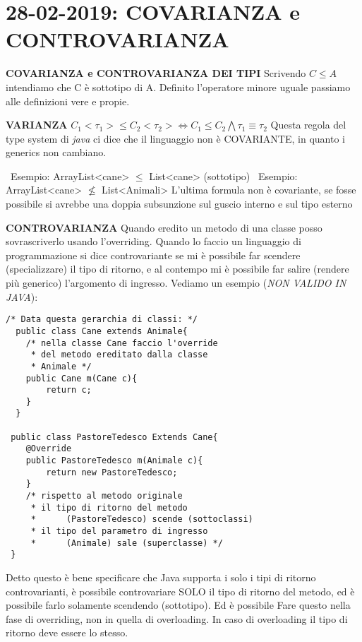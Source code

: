 

\newpage
\section{28-02-2019: COVARIANZA e CONTROVARIANZA}
\textbf{COVARIANZA e CONTROVARIANZA DEI TIPI }\newline
Scrivendo  $C \leq A$ intendiamo che C è sottotipo di A. Definito l'operatore minore uguale passiamo alle definizioni vere e propie.

\noindent \textbf{VARIANZA} \newline
$C_{1} <\tau_{1}> \leq C_{2}<\tau_{2}> \Leftrightarrow C_{1} \leq C_{2} \bigwedge \tau_{1}\equiv \tau_{2} $
\newline
Questa regola del type system di \textit{java} ci dice che il linguaggio non è COVARIANTE, in quanto i generics non cambiano. 

\noindent \textbullet\ Esempio: ArrayList<cane> $\leq$ List<cane> (sottotipo) \newline
\textbullet\ Esempio: ArrayList<cane> $\nleq$ List<Animali> \newline
L'ultima formula non è covariante, se fosse possibile si avrebbe una doppia subsunzione sul guscio interno e sul tipo esterno \newline

\noindent \textbf{CONTROVARIANZA} \newline
Quando eredito un metodo di una classe posso sovrascriverlo usando l'overriding. Quando lo faccio un linguaggio di programmazione si dice controvariante se mi è possibile far scendere (specializzare) il tipo di ritorno, e al contempo mi è possibile far salire (rendere più generico) l'argomento di ingresso. Vediamo un esempio (\textit{NON VALIDO IN JAVA}):
\begin{lstlisting}
/* Data questa gerarchia di classi: */
  public class Cane extends Animale{
	/* nella classe Cane faccio l'override
 	 * del metodo ereditato dalla classe
 	 * Animale */  
	public Cane m(Cane c){
		return c;
	}
  }
  
 public class PastoreTedesco Extends Cane{
 	@Override
	public PastoreTedesco m(Animale c){
		return new PastoreTedesco;
	}
	/* rispetto al metodo originale
	 * il tipo di ritorno del metodo 
	 *		(PastoreTedesco) scende (sottoclassi)
 	 * il tipo del parametro di ingresso 
 	 * 		(Animale) sale (superclasse) */	
 }
\end{lstlisting}

\noindent Detto questo è bene specificare che Java supporta i solo i tipi di ritorno controvarianti, è possibile controvariare SOLO il tipo di ritorno del metodo, ed è possibile farlo solamente scendendo (sottotipo). Ed è possibile Fare questo nella fase di overriding, non in quella di overloading. In caso di overloading il tipo di ritorno deve essere lo stesso.

